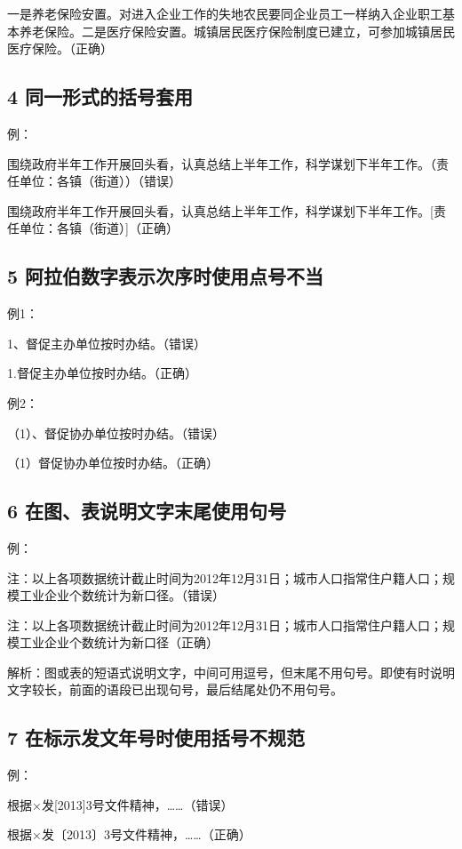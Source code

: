 一是养老保险安置。对进入企业工作的失地农民要同企业员工一样纳入企业职工基本养老保险。二是医疗保险安置。城镇居民医疗保险制度已建立，可参加城镇居民医疗保险。（正确）

\subsection*{4 同一形式的括号套用}

例：

围绕政府半年工作开展回头看，认真总结上半年工作，科学谋划下半年工作。（责任单位：各镇（街道））（错误）

围绕政府半年工作开展回头看，认真总结上半年工作，科学谋划下半年工作。[责任单位：各镇（街道）]（正确）

\subsection*{5 阿拉伯数字表示次序时使用点号不当}

例1：

1、督促主办单位按时办结。（错误）

1.督促主办单位按时办结。（正确）

例2：

（1）、督促协办单位按时办结。（错误）

（1）督促协办单位按时办结。（正确）

\subsection*{6 在图、表说明文字末尾使用句号}

例：

注：以上各项数据统计截止时间为2012年12月31日；城市人口指常住户籍人口；规模工业企业个数统计为新口径。（错误）

注：以上各项数据统计截止时间为2012年12月31日；城市人口指常住户籍人口；规模工业企业个数统计为新口径（正确）

解析：图或表的短语式说明文字，中间可用逗号，但末尾不用句号。即使有时说明文字较长，前面的语段已出现句号，最后结尾处仍不用句号。

\subsection*{7 在标示发文年号时使用括号不规范}

例：

根据×发[2013]3号文件精神，……（错误）

根据×发〔2013〕3号文件精神，……（正确）


